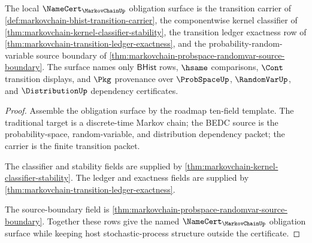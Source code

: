 \begin{theorem}
\label{thm:markovchain-namecert-obligation-surface}
The local $\NameCert_{\MarkovChainUp}$ obligation surface is the transition carrier of \autoref{def:markovchain-bhist-transition-carrier}, the componentwise kernel classifier of \autoref{thm:markovchain-kernel-classifier-stability}, the transition ledger exactness row of \autoref{thm:markovchain-transition-ledger-exactness}, and the probability-random-variable source boundary of \autoref{thm:markovchain-probspace-randomvar-source-boundary}. The surface names only $\mathsf{BHist}$ rows, $\hsame$ comparisons, $\Cont$ transition displays, and $\Pkg$ provenance over $\ProbSpaceUp$, $\RandomVarUp$, and $\DistributionUp$ dependency certificates.
\end{theorem}
\begin{proof}
Assemble the obligation surface by the roadmap ten-field template. The traditional target is a discrete-time Markov chain; the BEDC source is the probability-space, random-variable, and distribution dependency packet; the carrier is the finite transition packet.

The classifier and stability fields are supplied by \autoref{thm:markovchain-kernel-classifier-stability}. The ledger and exactness fields are supplied by \autoref{thm:markovchain-transition-ledger-exactness}.

The source-boundary field is \autoref{thm:markovchain-probspace-randomvar-source-boundary}. Together these rows give the named $\NameCert_{\MarkovChainUp}$ obligation surface while keeping host stochastic-process structure outside the certificate.
\end{proof}

